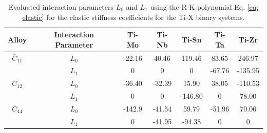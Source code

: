 \newpage
\begin{table}[H]
	\caption{Evaluated interaction parameters $L_0$ and $L_1$ using the R-K polynomial Eq. \ref{eq: elastic} for the elastic stiffness coefficients for the Ti-X binary systems.}
	\centering
	\begin{tabular}{ c c c c c c c }
		\hline
		Alloy & Interaction Parameter & Ti-Mo & Ti-Nb & Ti-Sn & Ti-Ta & Ti-Zr\\
		\hline
		$\bar{C}_{11}$ & $L_0$ & -22.16 & 40.46 & 119.46 & 83.65 & 246.97\\
		& $L_1$ & 0 & 0 & 0 & -67.76 & -135.95\\
		$\bar{C}_{12}$ & $L_0$ & -36.40 & -32.39 & 15.90 & 38.05 & -110.53\\
		& $L_1$ & 0 & 0 & -146.80 & 0 & 78.00\\
		$\bar{C}_{44}$ & $L_0$ & -142.9 & -41.54 & 59.79 & -51.96 & 70.06\\
		& $L_1$ & 0 & -41.95 & -94.38 & 0 & 0\\	
		\hline
	\end{tabular}
	\label{Ch5-table:tixelasip}
\end{table}
\clearpage

